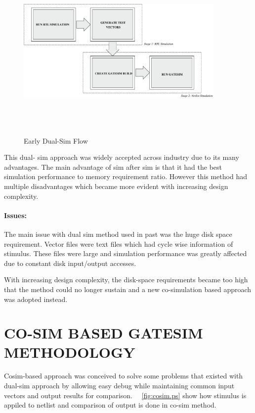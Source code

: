 \begin{figure}[H]
\centering
\includegraphics[width=4in, height=3.5in]{./figures/earlydualsim.eps}
\caption{Early Dual-Sim Flow}
\label{fig:earlydualsim.eps}
\end{figure}

This dual- sim approach was widely accepted across industry due to its many advantages. The main advantage of sim after sim is that it had the best simulation performance to memory requirement ratio. However this method had multiple disadvantages which became more evident with increasing design complexity.

\paragraph{Issues:}The main issue with dual sim method used in past was the huge disk space requirement. Vector files were text files which had cycle wise information of stimulus. These files were large and simulation performance was greatly affected due to constant disk input/output accesses. 

 
 With increasing design complexity, the disk-space requirements became too high that the method could no longer sustain and a new co-simulation based approach was adopted instead.





\section{CO-SIM BASED GATESIM METHODOLOGY}
 Cosim-based approach was conceived to solve some problems that existed with dual-sim approach by allowing easy debug while maintaining common input vectors and output results for comparison.  ~\figurename{~\ref{fig:cosim.ps}} show how stimulus is appiled to netlist and comparison of output is done in co-sim method.
 

